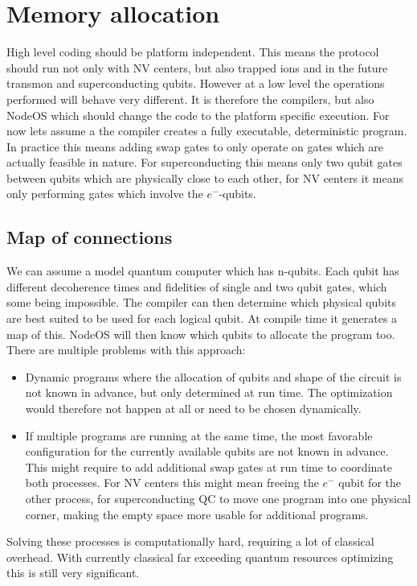 \documentclass[]{article}
\begin{document}
\section{Memory allocation}
High level coding should be platform independent. This means the protocol should run not only with NV centers, but also trapped ions and in the future transmon and superconducting qubits. However at a low level the operations performed will behave very different. It is therefore the compilers, but also NodeOS which should change the code to the platform specific execution. For now lets assume a the compiler creates a fully executable, deterministic program. In practice this means adding swap gates to only operate on gates which are actually feasible in nature. For superconducting this means only two qubit gates between qubits which are physically close to each other, for NV centers it means only performing gates which involve the $e^-$-qubits. 
\subsection{Map of connections}
We can assume a model quantum computer which has n-qubits. Each qubit has different decoherence times and fidelities of single and two qubit gates, which some being impossible. The compiler can then determine which physical qubits are best suited to be used for each logical qubit. At compile time it generates a map of this. NodeOS will then know which qubits to allocate the program too. There are multiple problems with this approach:
\begin{itemize}
	\item Dynamic programs where the allocation of qubits and shape of the circuit is not known in advance, but only determined at run time. The optimization would therefore not happen at all or need to be chosen dynamically.
	\item If multiple programs are running at the same time, the most favorable configuration for the currently available qubits are not known in advance. This might require to add additional swap gates at run time to coordinate both processes. For NV centers this might mean freeing the $e^-$ qubit for the other process, for superconducting QC to move one program into one physical corner, making the empty space more usable for additional programs.
\end{itemize}
Solving these processes is computationally hard, requiring a lot of classical overhead. With currently classical far exceeding quantum resources optimizing this is still very significant.
\end{document}
